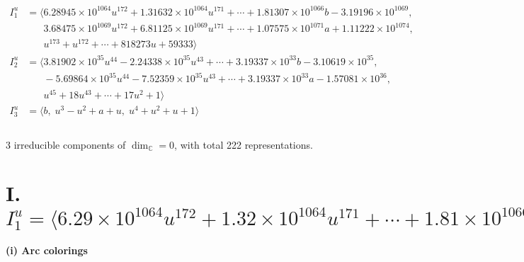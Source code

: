 \documentclass[1p]{elsarticle_modified}
\theoremstyle{definition}
\begin{document}
\begin{align*}
I^u_{1}&=\langle 
6.28945\times10^{1064} u^{172}+1.31632\times10^{1064} u^{171}+\cdots+1.81307\times10^{1066} b-3.19196\times10^{1069},\\
\phantom{I^u_{1}}&\phantom{= \langle  }3.68475\times10^{1069} u^{172}+6.81125\times10^{1069} u^{171}+\cdots+1.07575\times10^{1071} a+1.11222\times10^{1074},\\
\phantom{I^u_{1}}&\phantom{= \langle  }u^{173}+u^{172}+\cdots+818273 u+59333\rangle \\
I^u_{2}&=\langle 
3.81902\times10^{35} u^{44}-2.24338\times10^{35} u^{43}+\cdots+3.19337\times10^{33} b-3.10619\times10^{35},\\
\phantom{I^u_{2}}&\phantom{= \langle  }-5.69864\times10^{35} u^{44}-7.52359\times10^{35} u^{43}+\cdots+3.19337\times10^{33} a-1.57081\times10^{36},\\
\phantom{I^u_{2}}&\phantom{= \langle  }u^{45}+18 u^{43}+\cdots+17 u^2+1\rangle \\
I^u_{3}&=\langle 
b,\;u^3- u^2+a+u,\;u^4+u^2+u+1\rangle \\
\\
\end{align*}
\raggedright * 3 irreducible components of $\dim_{\mathbb{C}}=0$, with total 222 representations.\\
\newpage
\renewcommand{\arraystretch}{1}
\centering \section*{I. $I^u_{1}= \langle 6.29\times10^{1064} u^{172}+1.32\times10^{1064} u^{171}+\cdots+1.81\times10^{1066} b-3.19\times10^{1069},\;3.68\times10^{1069} u^{172}+6.81\times10^{1069} u^{171}+\cdots+1.08\times10^{1071} a+1.11\times10^{1074},\;u^{173}+u^{172}+\cdots+818273 u+59333 \rangle$}
\flushleft \textbf{(i) Arc colorings}\\
\end{document}

